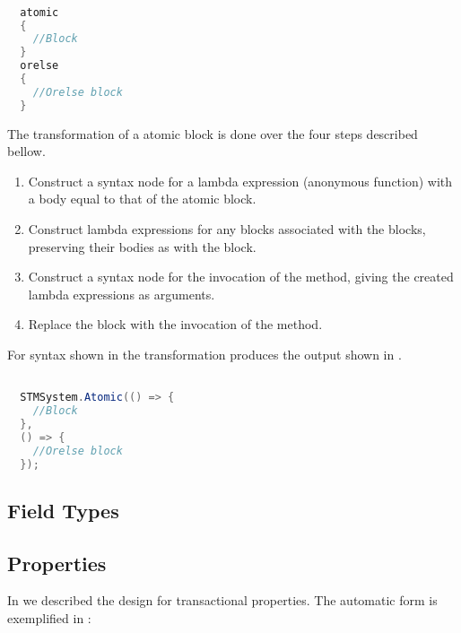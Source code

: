 \begin{lstlisting}[label=lst:before_atomic_block,
  caption={\bscode{atomic} Block Before Transformation},
  language=Java,  
  showspaces=false,
  showtabs=false,
  breaklines=true,
  showstringspaces=false,
  breakatwhitespace=true,
  commentstyle=\color{greencomments},
  keywordstyle=\color{bluekeywords},
  stringstyle=\color{redstrings},
  morekeywords={atomic, retry, orelse, var, get, set}]  % Start your code-block

  atomic
  {
    //Block
  }
  orelse
  {
    //Orelse block
  }
\end{lstlisting}
The transformation of a atomic block is done over the four steps described bellow.
\begin{enumerate}
	\item Construct a syntax node for a lambda expression (anonymous function) with a body equal to that of the atomic block.
	\item Construct lambda expressions for any  blocks associated with the  blocks, preserving their bodies as with the  block.
	\item Construct a syntax node for the invocation of the  method, giving the created lambda expressions as arguments.
	\item Replace the  block with the invocation of the  method.
\end{enumerate}
For syntax shown in  the transformation produces the output shown in .

\begin{lstlisting}[label=lst:after_atomic_block,
  caption={\bscode{atomic} Block After Transformation},
  language=Java,  
  showspaces=false,
  showtabs=false,
  breaklines=true,
  showstringspaces=false,
  breakatwhitespace=true,
  commentstyle=\color{greencomments},
  keywordstyle=\color{bluekeywords},
  stringstyle=\color{redstrings},
  morekeywords={atomic, retry, orelse, var, get, set}]  % Start your code-block

  STMSystem.Atomic(() => {
    //Block					
  },
  () => {
    //Orelse block
  });
\end{lstlisting}

\subsection{Field Types}\label{subsec:extension_field}
\subsection{Properties}
In  we described the design for transactional properties. The automatic form is exemplified in :


